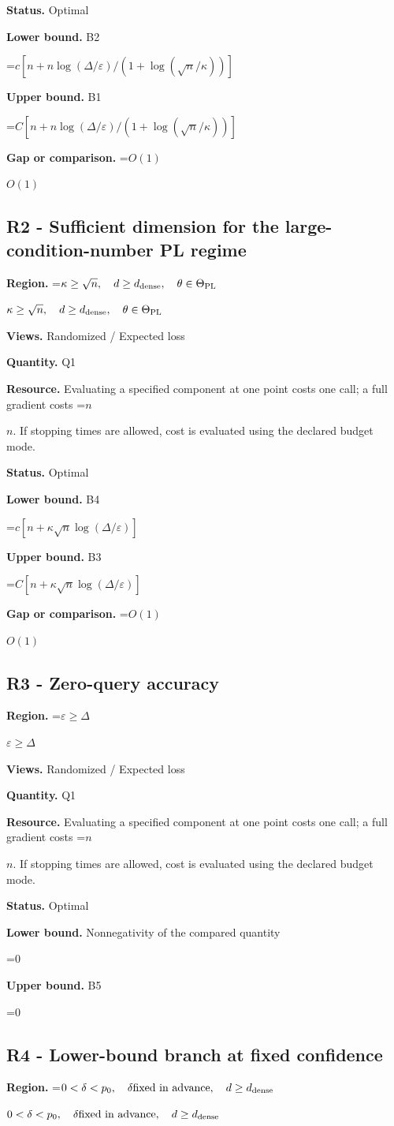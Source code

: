 \documentclass[10pt,a4paper]{article}
\newcommand{\AtlasMath}[1]{\par\begingroup\centering\setbox0=\hbox{$\displaystyle #1$}\ifdim\wd0>1.4\linewidth\typeout{ATLAS WIDE FORMULA: \the\wd0}\fi\ifdim\wd0>\linewidth\resizebox{\linewidth}{!}{\box0}\else\box0\fi\par\endgroup}
\newcommand{\AtlasInlineMath}[1]{\begingroup\setbox0=\hbox{$#1$}\ifdim\wd0>.4\linewidth\endgroup\AtlasMath{#1}\else\endgroup$#1$\fi}
\begin{document}
\textbf{Status.} Optimal

\textbf{Lower bound.} B2

\AtlasMath{c[n+n\log(\Delta/\varepsilon)/(1+\log(\sqrt n/\kappa))]}
\textbf{Upper bound.} B1

\AtlasMath{C[n+n\log(\Delta/\varepsilon)/(1+\log(\sqrt n/\kappa))]}
\textbf{Gap or comparison.} \AtlasInlineMath{O(1)}

\subsection{R2 - Sufficient dimension for the large-condition-number PL regime}
\textbf{Region.} \AtlasInlineMath{\kappa\ge\sqrt n,\quad d\ge d_{\rm dense},\quad\theta\in\Theta_{\rm PL}}

\textbf{Views.} Randomized / Expected loss

\textbf{Quantity.} Q1

\textbf{Resource.} Evaluating a specified component at one point costs one call; a full gradient costs \AtlasInlineMath{n}. If stopping times are allowed, cost is evaluated using the declared budget mode.

\textbf{Status.} Optimal

\textbf{Lower bound.} B4

\AtlasMath{c[n+\kappa\sqrt n\log(\Delta/\varepsilon)]}
\textbf{Upper bound.} B3

\AtlasMath{C[n+\kappa\sqrt n\log(\Delta/\varepsilon)]}
\textbf{Gap or comparison.} \AtlasInlineMath{O(1)}

\subsection{R3 - Zero-query accuracy}
\textbf{Region.} \AtlasInlineMath{\varepsilon\ge\Delta}

\textbf{Views.} Randomized / Expected loss

\textbf{Quantity.} Q1

\textbf{Resource.} Evaluating a specified component at one point costs one call; a full gradient costs \AtlasInlineMath{n}. If stopping times are allowed, cost is evaluated using the declared budget mode.

\textbf{Status.} Optimal

\textbf{Lower bound.} Nonnegativity of the compared quantity

\AtlasMath{0}
\textbf{Upper bound.} B5

\AtlasMath{0}
\subsection{R4 - Lower-bound branch at fixed confidence}
\textbf{Region.} \AtlasInlineMath{0<\delta<p_0,\quad\delta\text{fixed in advance},\quad d\ge d_{\rm dense}}
\end{document}
